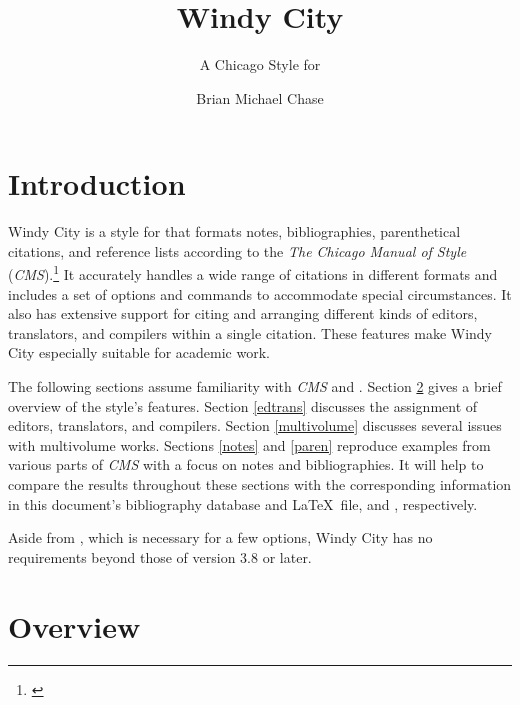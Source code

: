 \documentclass[11pt,letterpaper,oneside]{article}
\begin{document}
\title{Windy City}
\subtitle{A Chicago Style for \biblatex}
\author{Brian Michael Chase}
\maketitle
\tableofcontents{}

\section{Introduction}


Windy City is a style for \biblatex that formats notes,
bibliographies, parenthetical citations, and reference lists according
to the \textit{The Chicago Manual of Style}
(\textit{CMS}).\footnote{\cite{chicago2017}} It accurately handles a
wide range of citations in different formats and includes a set of
options and commands to accommodate special circumstances. It also has
extensive support for citing and arranging different kinds of editors,
translators, and compilers within a single citation. These features
make Windy City especially suitable for academic work.

The following sections assume familiarity with \textit{CMS} and
\biblatex. Section \ref{overview} gives a brief overview of the
style's features. Section \ref{edtrans} discusses the assignment of
editors, translators, and compilers. Section \ref{multivolume}
discusses several issues with multivolume works. Sections \ref{notes}
and \ref{paren} reproduce examples from various parts of \textit{CMS}
with a focus on notes and bibliographies. It will help to compare the
results throughout these sections with the corresponding information
in this document's bibliography database and \LaTeX\ file,
 and , respectively.

Aside from \biber, which is necessary for a few options, Windy City
has no requirements beyond those of \biblatex version 3.8 or later.

\section{Overview}
\label{overview}
\end{document}
